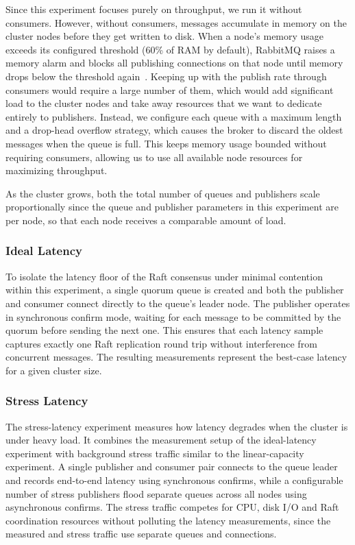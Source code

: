 Since this experiment focuses purely on throughput, we run it without consumers. However, without consumers, messages accumulate in memory on the cluster nodes before they get written to disk. When a node's memory usage exceeds its configured threshold (60\% of RAM by default), RabbitMQ raises a memory alarm and blocks all publishing connections on that node until memory drops below the threshold again~\cite{rmq_memory_docs, rmq_flow_control_docs}. Keeping up with the publish rate through consumers would require a large number of them, which would add significant load to the cluster nodes and take away resources that we want to dedicate entirely to publishers. Instead, we configure each queue with a maximum length and a drop-head overflow strategy, which causes the broker to discard the oldest messages when the queue is full. This keeps memory usage bounded without requiring consumers, allowing us to use all available node resources for maximizing throughput.

As the cluster grows, both the total number of queues and publishers scale proportionally since the queue and publisher parameters in this experiment are per node, so that each node receives a comparable amount of load.

\subsubsection{Ideal Latency}
To isolate the latency floor of the Raft consensus under minimal contention within this experiment, a single quorum queue is created and both the publisher and consumer connect directly to the queue's leader node. The publisher operates in synchronous confirm mode, waiting for each message to be committed by the quorum before sending the next one. This ensures that each latency sample captures exactly one Raft replication round trip without interference from concurrent messages. The resulting measurements represent the best-case latency for a given cluster size.

\subsubsection{Stress Latency}
The stress-latency experiment measures how latency degrades when the cluster is under heavy load. It combines the measurement setup of the ideal-latency experiment with background stress traffic similar to the linear-capacity experiment. A single publisher and consumer pair connects to the queue leader and records end-to-end latency using synchronous confirms, while a configurable number of stress publishers flood separate queues across all nodes using asynchronous confirms. The stress traffic competes for CPU, disk I/O and Raft coordination resources without polluting the latency measurements, since the measured and stress traffic use separate queues and connections.

